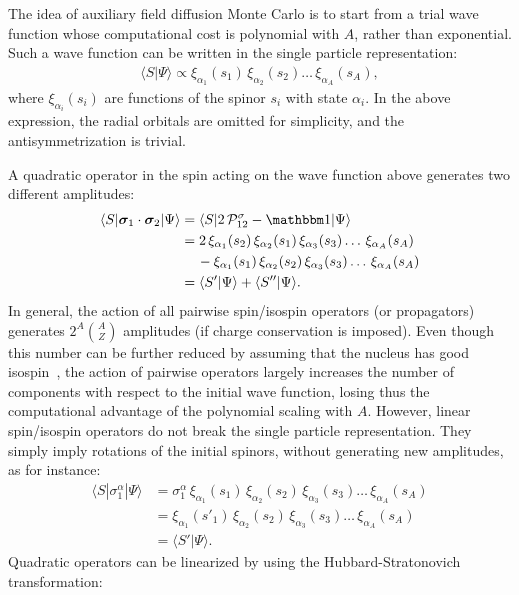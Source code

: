 \documentclass[aps,prc,twocolumn,superscriptaddress,floatfix]{revtex4-1}
\begin{document}
The idea of auxiliary field diffusion Monte Carlo is to start from a trial wave function
whose computational cost is polynomial with $A$, rather than exponential.
Such a wave function can be written in the single particle representation:
\begin{align}
\langle S|\Psi\rangle\propto\xi_{\alpha_1}(s_1)\,\xi_{\alpha_2}(s_2)\dots\,\xi_{\alpha_A}(s_A) ,
\label{eq:wf_s}
\end{align}
where $\xi_{\alpha_i}(s_i)$ are functions of the spinor $s_i$ with state $\alpha_i$. 
In the above expression, the radial orbitals are omitted for simplicity, 
and the antisymmetrization is trivial.

A quadratic operator in the spin acting on the wave function above generates two different amplitudes:
\begin{align}
\langle S|\bm\sigma_1\cdot\bm\sigma_2|\Psi\rangle & =\langle S|2\,\mathcal P_{12}^\sigma-\mathbbm1|\Psi\rangle \nonumber \\
& =2\,\xi_{\alpha_1}(s_2)\,\xi_{\alpha_2}(s_1)\,\xi_{\alpha_3}(s_3)\dots\,\xi_{\alpha_A}(s_A) \nonumber \\
& \quad\,-\xi_{\alpha_1}(s_1)\,\xi_{\alpha_2}(s_2)\,\xi_{\alpha_3}(s_3)\dots\,\xi_{\alpha_A}(s_A) \nonumber \\
& =\langle S'|\Psi\rangle+\langle S''|\Psi\rangle .
\end{align}
In general, the action of all pairwise spin/isospin operators (or propagators) generates $2^A\binom{A}{Z}$ 
amplitudes (if charge conservation is imposed). Even though this number can be further reduced by 
assuming that the nucleus has good isospin~\cite{Carlson:2015}, the action of pairwise operators 
largely increases the number of components with respect to the initial wave function, losing thus the 
computational advantage of the polynomial scaling with $A$.
However, linear spin/isospin operators do not break the single particle representation. 
They simply imply rotations of the initial spinors, without generating new amplitudes, as for instance:
\begin{align}
\langle S|\sigma_1^\alpha|\Psi\rangle &=
\sigma_1^\alpha\,\xi_{\alpha_1}(s_1)\,\xi_{\alpha_2}(s_2)\,\xi_{\alpha_3}(s_3)\dots\,\xi_{\alpha_A}(s_A) \nonumber \\
& =\xi_{\alpha_1}(s'_1)\,\xi_{\alpha_2}(s_2)\,\xi_{\alpha_3}(s_3)\dots\,\xi_{\alpha_A}(s_A) \nonumber \\
& =\langle S'|\Psi\rangle .
\end{align}
Quadratic operators can be linearized by using the Hubbard-Stratonovich transformation:
\end{document}
